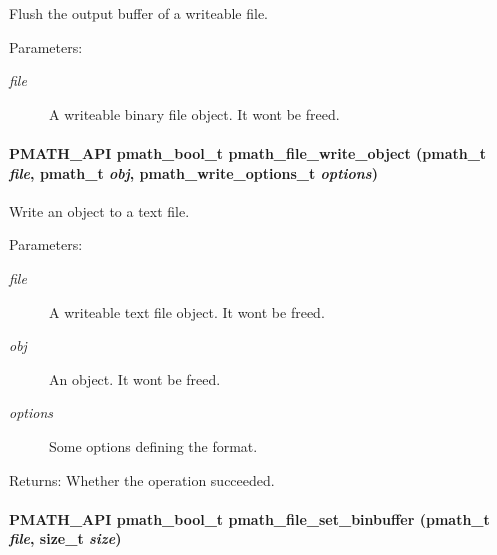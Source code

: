 Flush the output buffer of a writeable file. 

\begin{Desc}
\item[Parameters:]
\begin{description}
\item[{\em file}]A writeable binary file object. It wont be freed. \end{description}
\end{Desc}
\hypertarget{group__file__api_gf6b8233107d3fb27e9fdabfacc8595d1}{
\paragraph[{pmath\_\-file\_\-write\_\-object}]{\setlength{\rightskip}{0pt plus 5cm}PMATH\_\-API {\bf pmath\_\-bool\_\-t} pmath\_\-file\_\-write\_\-object ({\bf pmath\_\-t} {\em file}, \/  {\bf pmath\_\-t} {\em obj}, \/  {\bf pmath\_\-write\_\-options\_\-t} {\em options})}\hfill}
\label{group__file__api_gf6b8233107d3fb27e9fdabfacc8595d1}


Write an object to a text file. 

\begin{Desc}
\item[Parameters:]
\begin{description}
\item[{\em file}]A writeable text file object. It wont be freed. \item[{\em obj}]An object. It wont be freed. \item[{\em options}]Some options defining the format. \end{description}
\end{Desc}
\begin{Desc}
\item[Returns:]Whether the operation succeeded. \end{Desc}
\hypertarget{group__file__api_g7f852f3c8057a535541fbf64f75940d2}{
\paragraph[{pmath\_\-file\_\-set\_\-binbuffer}]{\setlength{\rightskip}{0pt plus 5cm}PMATH\_\-API {\bf pmath\_\-bool\_\-t} pmath\_\-file\_\-set\_\-binbuffer ({\bf pmath\_\-t} {\em file}, \/  size\_\-t {\em size})}\hfill}
\label{group__file__api_g7f852f3c8057a535541fbf64f75940d2}


